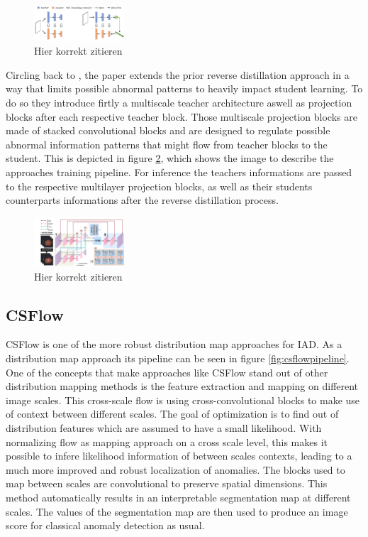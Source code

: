 \begin{figure}[ht]
    \centering
    \includegraphics[width=0.3\textwidth]{figures/revdist_bottleneck.png}
    \caption{Hier korrekt zitieren}
    \label{fig:revdistbottleneck}
\end{figure}

Circling back to \cite{revdist2023}, the paper extends the prior reverse distillation approach in a way that limits possible abnormal patterns to heavily impact student learning. To do so they 
introduce firtly a multiscale teacher architecture aswell as projection blocks after each respective teacher block. Those multiscale projection blocks are made of stacked convolutional blocks 
and are designed to regulate possible abnormal information patterns that might flow from teacher blocks to the student. This is depicted in figure \ref{fig:revdistpipeline}, which shows the image to describe the 
approaches training pipeline. For inference the teachers informations are passed to the respective multilayer projection blocks, as well as their students counterparts informations after the 
reverse distillation process.

\begin{figure}[ht]
    \centering
    \includegraphics[width=0.3\textwidth]{figures/revdistpipeline.png}
    \caption{Hier korrekt zitieren}
    \label{fig:revdistpipeline}
\end{figure}


\subsection{CSFlow}
\label{subsec:csflow}

CSFlow \cite{csflow2022} is one of the more robust distribution map approaches for IAD. As a distribution map approach its pipeline can be seen in figure \ref{fig:csflowpipeline}. One of the concepts that make 
approaches like CSFlow stand out of other distribution mapping methods is the feature extraction and mapping on different image scales. This cross-scale flow is using cross-convolutional 
blocks \cite{liu2024deep} to make use of context between different scales. The goal of optimization is to find out of distribution features which are assumed to have a small likelihood. 
With normalizing flow \cite{Kobyzev_2021normalizingflowexplanation} as mapping approach on a cross scale level, this makes it possible to infere likelihood information of between scales contexts, 
leading to a much more improved and robust localization of anomalies. The blocks used to map between scales 
are convolutional to preserve spatial dimensions. This method automatically results in an interpretable segmentation map at different scales. The values of the segmentation map are then used to produce an 
image score for classical anomaly detection as usual.

